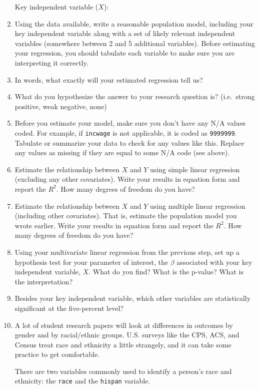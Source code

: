 \documentclass[11pt]{article}
\begin{document}
\begin{enumerate}
  Key independent variable (\(X\)):\\
\item
  Using the data available, write a reasonable population model,
  including your key independent variable along with a set of likely
  relevant independent variables (somewhere between 2 and 5 additional
  variables). Before estimating your regression, you should tabulate
  each variable to make sure you are interpreting it correctly.
\item
  In words, what exactly will your estimated regression tell us?
\item
  What do you hypothesize the answer to your research question is?
  (i.e.~strong positive, weak negative, none)
\item
  Before you estimate your model, make sure you don't have any N/A
  values coded. For example, if \texttt{incwage} is not applicable, it
  is coded as \texttt{9999999}. Tabulate or summarize your data to check
  for any values like this. Replace any values as missing if they are
  equal to some N/A code (see above).
\item
  Estimate the relationship between \(X\) and \(Y\) using simple linear
  regression (excluding any other covariates). Write your results in
  equation form and report the \(R^2\). How many degrees of freedom do
  you have?
\item
  Estimate the relationship between \(X\) and \(Y\) using multiple
  linear regression (including other covariates). That is, estimate the
  population model you wrote earlier. Write your results in equation
  form and report the \(R^2\). How many degrees of freedom do you have?
\item
  Using your multivariate linear regression from the previous step, set
  up a hypothesis test for your parameter of interest, the \(\beta\)
  associated with your key independent variable, \(X\). What do you
  find? What is the p-value? What is the interpretation?
\item
  Besides your key independent variable, which other variables are
  statistically significant at the five-percent level?
\item
  A lot of student research papers will look at differences in outcomes
  by gender and by racial/ethnic groups. U.S. surveys like the CPS, ACS,
  and Census treat race and ethnicity a little strangely, and it can
  take some practice to get comfortable.

  There are two variables commonly used to identify a person's race and
  ethnicity: the \texttt{race} and the \texttt{hispan} variable.


\end{enumerate}
\end{document}
